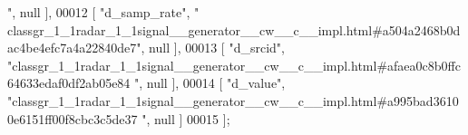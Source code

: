 \begin{DoxyCode}
{      "}, null ],
00012     [ \textcolor{stringliteral}{"d\_samp\_rate"}, \textcolor{stringliteral}{"
      classgr\_1\_1radar\_1\_1signal\_\_generator\_\_cw\_\_c\_\_impl.html#a504a2468b0dac4be4efc7a4a22840de7"}, null ],
00013     [ \textcolor{stringliteral}{"d\_srcid"}, \textcolor{stringliteral}{"classgr\_1\_1radar\_1\_1signal\_\_generator\_\_cw\_\_c\_\_impl.html#afaea0c8b0ffc64633edaf0df2ab05e84
      "}, null ],
00014     [ \textcolor{stringliteral}{"d\_value"}, \textcolor{stringliteral}{"classgr\_1\_1radar\_1\_1signal\_\_generator\_\_cw\_\_c\_\_impl.html#a995bad36100e6151ff00f8cbc3c5de37
      "}, null ]
00015 ];
\end{DoxyCode}
